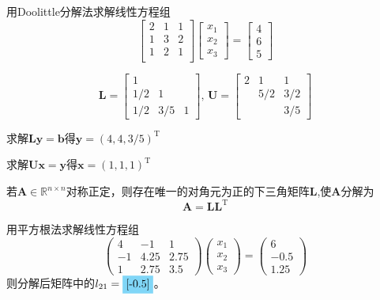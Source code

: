 \begin{example}
    用Doolittle分解法求解线性方程组
    \[
        \begin{bmatrix}
            2 & 1 & 1\\
            1 & 3 & 2\\
            1 & 2 & 1\\
        \end{bmatrix}
        \begin{bmatrix}
            x_1\\x_2\\x_3
        \end{bmatrix}
         = \begin{bmatrix}
            4 \\ 6 \\ 5
         \end{bmatrix}
    \]
    \begin{solution}
        \[
            \boldsymbol{L} = \begin{bmatrix}
                1 &&\\
                1/2&1&\\
                1/2&3/5&1
            \end{bmatrix}
            ,\,
            \boldsymbol{U} = \begin{bmatrix}
                2 &1&1\\
                &5/2&3/2\\
                &&3/5
            \end{bmatrix}
        \]
        
        求解$\boldsymbol{Ly} = \boldsymbol{b}$得$\boldsymbol{y} = (4,4,3/5)^{\mathrm{T}}$

        求解$\boldsymbol{Ux} = \boldsymbol{y}$得$\boldsymbol{x} = (1,1,1)^{\mathrm{T}}$
    \end{solution}
\end{example}
\begin{definition}
    若$\boldsymbol{A}\in \mathbb{R}^{n\times n}$对称正定，则存在唯一的对角元为正的下三角矩阵$\boldsymbol{L}$,使$\boldsymbol{A}$分解为
    \[
        \boldsymbol{A} = \boldsymbol{L}\boldsymbol{L}^{\mathrm{T}}
    \]
\end{definition}
\begin{example}
    用平方根法求解线性方程组
    \[
        \begin{pmatrix}
            4&-1&1\\
            -1&4.25&2.75\\
            1&2.75&3.5
        \end{pmatrix}
        \begin{pmatrix}
            x_1\\x_2\\x_3
        \end{pmatrix}=
        \begin{pmatrix}
            6\\-0.5\\1.25
        \end{pmatrix}
    \]
    则分解后矩阵中的$l_{21}=\sol{-0.5}$。
\end{example}
